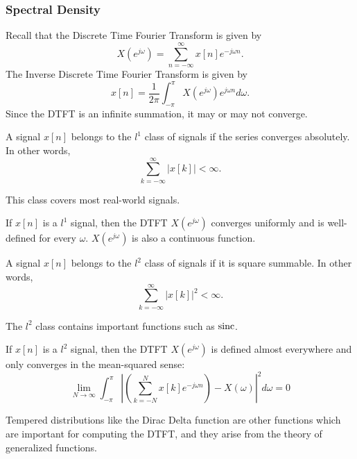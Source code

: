 \subsubsection{Spectral Density}
Recall that the Discrete Time Fourier Transform is given by \[
	X(e^{j\omega}) = \sum_{n=-\infty}^{\infty}x[n]e^{-j\omega n}.
\]
The Inverse Discrete Time Fourier Transform is given by \[
	x[n] = \frac{1}{2\pi}\int_{-\pi}^{\pi}X(e^{j\omega})e^{j\omega n}d\omega.
\]
Since the DTFT is an infinite summation, it may or may not converge.
\begin{definition}
	A signal $x[n]$ belongs to the $l^1$ class of signals if the series converges absolutely. In other words,
	\[
		\sum_{k=-\infty}^{\infty}|x[k]| < \infty.
	\]
	\label{defn:l1-class}
\end{definition}
This class covers most real-world signals.
\begin{theorem}
	If $x[n]$ is a $l^1$ signal, then the DTFT $X(e^{j\omega})$ converges uniformly and is well-defined for every $\omega$. $X(e^{j\omega})$ is also a continuous function.
	\label{thm:l1-dtft}
\end{theorem}
\begin{definition}
	A signal $x[n]$ belongs to the $l^2$ class of signals if it is square summable. In other words,
	\[
		\sum_{k=-\infty}^{\infty}|x[k]|^2 < \infty.
	\]
	\label{defn:l2-class}
\end{definition}
The $l^2$ class contains important functions such as $\operatorname*{sinc}$.
\begin{theorem}
	If $x[n]$ is a $l^2$ signal, then the DTFT $X(e^{j\omega})$ is defined almost everywhere and only converges in the mean-squared sense:
	\[
		\lim_{N\to\infty} \int_{-\pi}^{\pi}\left|\left(\sum_{k=-N}^N x[k]e^{-j\omega n}\right) - X(\omega)\right|^2d\omega = 0
	\]
	\label{thm:l2-dtft}
\end{theorem}
Tempered distributions like the Dirac Delta function are other functions which are important for computing the DTFT, and they arise from the theory of generalized functions.

